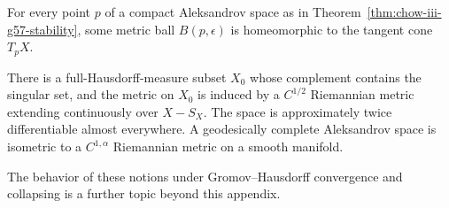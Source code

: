 \begin{corollary}
\label{cor:chow-iii-g59-small-balls}
For every point $p$ of a compact Aleksandrov space as in Theorem~\ref{thm:chow-iii-g57-stability},
some metric ball $B(p,\epsilon)$ is homeomorphic to the tangent cone $T_pX$.
\end{corollary}

\begin{theorem}
\label{thm:chow-iii-g60-regularity}
There is a full-Hausdorff-measure subset $X_0$ whose complement contains the
singular set, and the metric on $X_0$ is induced by a $C^{1/2}$ Riemannian
metric extending continuously over $X-S_X$.  The space is approximately twice
differentiable almost everywhere.  A geodesically complete Aleksandrov space
is isometric to a $C^{1,\alpha}$ Riemannian metric on a smooth manifold.
\end{theorem}

\begin{remark}
\label{rem:chow-iii-g61-further-convergence}
The behavior of these notions under Gromov--Hausdorff convergence and collapsing
is a further topic beyond this appendix.
\end{remark}
